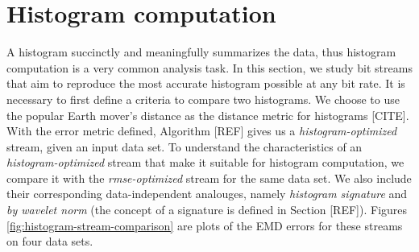 
\section{Histogram computation}
\label{sec:histogram}

A histogram succinctly and meaningfully summarizes the data, thus histogram computation is a very
common analysis task. In this section, we study bit streams that aim to reproduce the most accurate
histogram possible at any bit rate. It is necessary to first define a criteria to compare two
histograms. We choose to use the popular Earth mover's distance as the distance metric for
histograms [CITE]. With the error metric defined, Algorithm [REF] gives us a
\emph{histogram-optimized} stream, given an input data set. To understand the characteristics of an
\emph{histogram-optimized} stream that make it suitable for histogram computation, we compare it
with the \emph{rmse-optimized} stream for the same data set. We also include their corresponding
data-independent analouges, namely \emph{histogram signature} and \emph{by wavelet norm} (the
concept of a signature is defined in Section [REF]). Figures \ref{fig:histogram-stream-comparison}
are plots of the EMD errors for these streams on four data sets.

